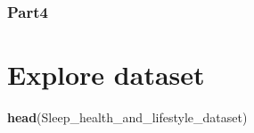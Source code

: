 \documentclass[
  11pt,
]{article}
\newenvironment{Shaded}{\begin{snugshade}}{\end{snugshade}}
\newcommand{\FunctionTok}[1]{\textcolor[rgb]{0.13,0.29,0.53}{\textbf{#1}}}
\newcommand{\NormalTok}[1]{#1}
\begin{document}
\hypertarget{part4}{%
\subsubsection{Part4}\label{part4}}

\hypertarget{explore-dataset}{%
\section{Explore dataset}\label{explore-dataset}}

\begin{Shaded}
\begin{Highlighting}[]
\FunctionTok{head}\NormalTok{(Sleep\_health\_and\_lifestyle\_dataset)}
\end{Highlighting}
\end{Shaded}
\end{document}
